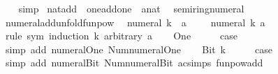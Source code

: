 \begin{isabellebody}
%
\isadelimproof
\ \ %
\endisadelimproof
%
\isatagproof
{}\isamarkupfalse%
\ simp%
\endisatagproof
{\isafoldproof}%
%
\isadelimproof
\isanewline
%
\endisadelimproof
\isanewline
{}\isamarkupfalse%
\ nat{\isacharunderscore}{\kern0pt}{}{\isacharunderscore}{\kern0pt}add{\isacharunderscore}{\kern0pt}{}\ {\isacharequal}{\kern0pt}\ one{\isacharunderscore}{\kern0pt}add{\isacharunderscore}{\kern0pt}one\ {\isacharbrackleft}{\kern0pt}\ {\isacharprime}{\kern0pt}a{\isacharequal}{\kern0pt}nat{\isacharbrackright}{\kern0pt}\ \isanewline
\isanewline
{}\isamarkupfalse%
\ semiring{\isacharunderscore}{\kern0pt}numeral\isanewline
{}\isanewline
\isanewline
{}\isamarkupfalse%
\ numeral{\isacharunderscore}{\kern0pt}add{\isacharunderscore}{\kern0pt}unfold{\isacharunderscore}{\kern0pt}funpow{\isacharcolon}{\kern0pt}\isanewline
\ \ {\isacartoucheopen}numeral\ k\ {\isacharplus}{\kern0pt}\ a\ {\isacharequal}{\kern0pt}\ {\isacharparenleft}{\kern0pt}{\isacharparenleft}{\kern0pt}{\isacharplus}{\kern0pt}{\isacharparenright}{\kern0pt}\ {}\ {\isacharcircum}{\kern0pt}{\isacharcircum}{\kern0pt}\ numeral\ k{\isacharparenright}{\kern0pt}\ a{\isacartoucheclose}\isanewline
%
\isadelimproof
%
\endisadelimproof
%
\isatagproof
{}\isamarkupfalse%
\ {\isacharparenleft}{\kern0pt}rule\ sym{\isacharcomma}{\kern0pt}\ induction\ k\ arbitrary{\isacharcolon}{\kern0pt}\ a{\isacharparenright}{\kern0pt}\isanewline
\ \ \isamarkupfalse%
\ One\isanewline
\ \ \isamarkupfalse%
\ \isamarkupfalse%
\ {\isacharquery}{\kern0pt}case\isanewline
\ \ \ \ \isamarkupfalse%
\ {\isacharparenleft}{\kern0pt}simp\ add{\isacharcolon}{\kern0pt}\ numeral{\isacharunderscore}{\kern0pt}One\ Num{\isachardot}{\kern0pt}numeral{\isacharunderscore}{\kern0pt}One{\isacharparenright}{\kern0pt}\isanewline
{}\isamarkupfalse%
\isanewline
\ \ \isamarkupfalse%
\ {\isacharparenleft}{\kern0pt}Bit{}\ k{\isacharparenright}{\kern0pt}\isanewline
\ \ \isamarkupfalse%
\ \isamarkupfalse%
\ {\isacharquery}{\kern0pt}case\isanewline
\ \ \ \ \isamarkupfalse%
\ {\isacharparenleft}{\kern0pt}simp\ add{\isacharcolon}{\kern0pt}\ numeral{\isacharunderscore}{\kern0pt}Bit{}\ Num{\isachardot}{\kern0pt}numeral{\isacharunderscore}{\kern0pt}Bit{}\ ac{\isacharunderscore}{\kern0pt}simps\ funpow{\isacharunderscore}{\kern0pt}add{\isacharparenright}{\kern0pt}\isanewline

\end{isabellebody}
